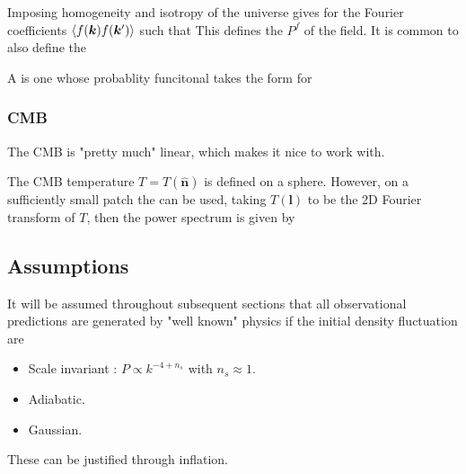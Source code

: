 \documentclass{article}
\begin{document}
\begin{lemma}
Imposing homogeneity and isotropy of the universe gives 
for the Fourier coefficients $\braket{f(\bm{k})f(\bm{k}^\prime)}$ such that 
This defines the  $P^f$ of the field. It is common to also define the  
\end{lemma}

\begin{definition}
A  is one whose probablity funcitonal takes the form 
for 
\end{definition}

\subsubsection*{CMB}
\begin{idea}
The CMB is "pretty much" linear, which makes it nice to work with. 
\end{idea}

\begin{definition}
The CMB temperature $T=T(\hat{\bm{n}})$ is defined on a sphere. However, on a sufficiently small patch the  can be used, taking $T(\bm{l})$ to be the 2D Fourier transform of $T$, then the power spectrum is given by 
\end{definition}

\subsection{Assumptions}
It will be assumed throughout subsequent sections that all observational predictions are generated by "well known" physics if the initial density fluctuation are 
\begin{itemize}
    \item Scale invariant : $P \propto k^{-4 + n_s}$ with $n_s \approx 1$. 
    \item Adiabatic. 
    \item Gaussian.
\end{itemize}
These can be justified through inflation. 
\end{document}
